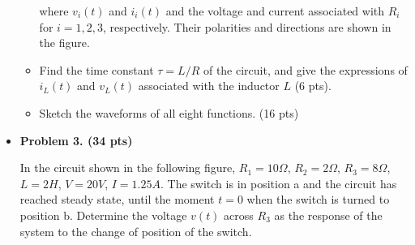 \begin{itemize}
\begin{itemize}
where $v_i(t)$ and $i_i(t)$ and the voltage and current associated with $R_i$
for $i=1,2,3$, respectively. Their polarities and directions are shown in the figure.

\item Find the time constant $\tau=L/R$ of the circuit, and give the expressions of
$i_L(t)$ and $v_L(t)$ associated with the inductor $L$ (6 pts).

\item Sketch the waveforms of all eight functions. (16 pts)

\end{itemize}

%




\item {\bf Problem 3. (34 pts)}

In the circuit shown in the following figure, $R_1=10 \Omega$, $R_2=2 \Omega$,
$R_3=8 \Omega$, $L=2 H$, $V=20 V$, $I=1.25 A$. The switch is in position a and
the circuit has reached steady state, until the moment $t=0$ when the switch is
turned to position b. Determine the voltage $v(t)$ across $R_3$ as the response
of the system to the change of position of the switch.


\end{itemize}
